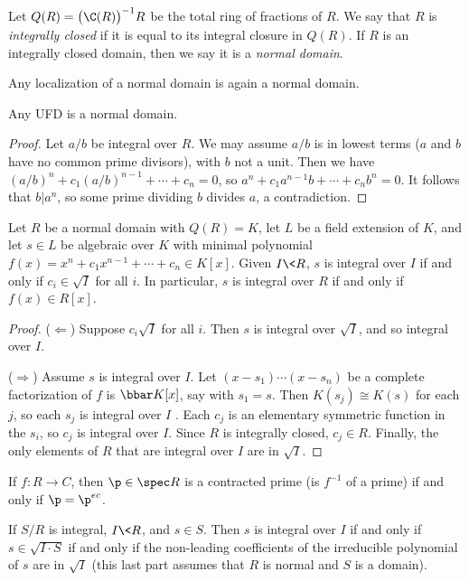  \begin{definition}
   Let $Q(R) = \bigl(\C(R)\bigr)^{-1} R$ be the total ring of fractions of $R$. We say
   that $R$ is \emph{integrally closed} if it is equal to its integral closure in $Q(R)$.
   If $R$ is an integrally closed domain, then we say it is a \emph{normal domain}.
 \end{definition}
 \begin{remark}
   Any localization of a normal domain is again a normal domain.
 \end{remark}
 \begin{proposition}
   Any UFD is a normal domain.
 \end{proposition}
 \begin{proof}
   Let $a/b$ be integral over $R$. We may assume $a/b$ is in lowest terms ($a$ and $b$
   have no common prime divisors), with $b$ not a unit. Then we have
   $(a/b)^n+c_1(a/b)^{n-1}+\cdots+ c_n=0$, so $a^n+c_1 a^{n-1}b+\cdots + c_nb^n=0$. It
   follows that $b|a^n$, so some prime dividing $b$ divides $a$, a contradiction.
 \end{proof}
 \begin{lemma}
   Let $R$ be a normal domain with $Q(R)=K$, let $L$ be a field extension of $K$, and let
   $s\in L$ be algebraic over $K$ with minimal polynomial $f(x)=x^n+c_1x^{n-1}+\cdots
   + c_n\in K[x]$. Given $I\< R$, $s$ is integral over $I$ if and only if $c_i\in \sqrt
   I$ for all $i$. In particular, $s$ is integral over $R$ if and only if $f(x)\in R[x]$.
 \end{lemma}
 \begin{proof}
   ($\Leftarrow$) Suppose $c_i \sqrt I$ for all $i$. Then $s$ is integral over $\sqrt I$,
   and so integral over $I$.

   ($\Rightarrow$) Assume $s$ is integral over $I$. Let $(x-s_1)\cdots (x-s_n)$ be a
   complete factorization of $f$ is $\bbar K[x]$, say with $s_1=s$. Then $K(s_j)\cong
   K(s)$ for each $j$, so each $s_j$ is integral over $I$ . Each $c_j$ is an elementary symmetric
   function in the $s_i$, so $c_j$ is integral over $I$. Since $R$ is integrally closed,
   $c_j\in R$. Finally, the only elements of $R$ that are integral over $I$ are in $\sqrt
   I$.
 \end{proof}
 \setcounter{lecture}{25}

 \begin{lemma}
   If $f:R\to C$, then $\p\in \spec R$ is a contracted prime (is $f^{-1}$ of a prime) if
   and only if $\p=\p^{ec}$.
 \end{lemma}
 \begin{lemma}
   If $S/R$ is integral, $I\< R$, and $s\in S$. Then $s$ is integral over $I$ if and only
   if $s\in \sqrt{I\cdot S}$ if and only if the non-leading coefficients of the
   irreducible polynomial of $s$ are in $\sqrt I$ (this last part assumes that $R$ is
   normal and $S$ is a domain).
 \end{lemma}

